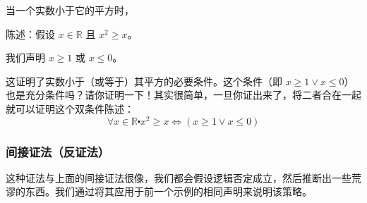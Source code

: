\begin{example}
    当一个实数小于它的平方时，
  
    陈述：假设 $ x \in \mathbb{R}$ 且 $x^2 \ge x$。

    我们声明 $x \ge 1$ 或 $x \le 0$。
\end{example}

\begin{center}
    \noindent {}
\end{center}

这证明了实数小于（或等于）其平方的必要条件。这个条件（即 $x \ge 1 \lor x \le 0$）也是充分条件吗？请你证明一下！其实很简单，一旦你证出来了，将二者合在一起就可以证明这个双条件陈述：
\[\forall x \in \mathbb{R} \centerdot x^2 \ge x \iff (x \ge 1 \lor x \le 0)\]


\subsubsection*{间接证法（反证法）}

这种证法与上面的间接证法很像，我们都会假设逻辑否定成立，然后推断出一些荒谬的东西。我们通过将其应用于前一个示例的相同声明来说明该策略。

\begin{center}
    \noindent {}
\end{center}

